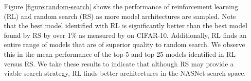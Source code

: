 Figure \ref{figure:random-search} shows the performance of reinforcement learning (RL) and random search (RS) as more model architectures are sampled. Note that the best model identified with RL is significantly better than the best model found by RS by over 1\% as measured by on CIFAR-10. Additionally, RL finds an entire range of models that are of superior quality to random search. We observe this in the mean performance of the top-5 and top-25 models identified in RL versus RS.
We take these results to indicate that although RS may provide a viable search strategy, RL finds better architectures in the NASNet search space.

